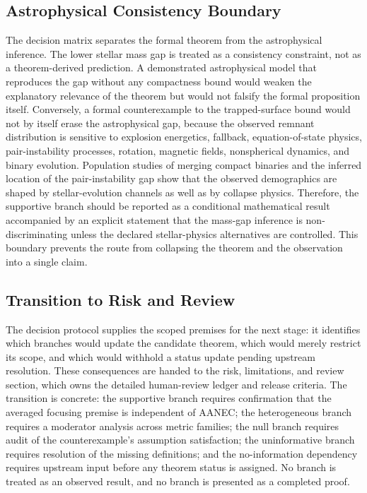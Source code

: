 \documentclass[conference]{IEEEtran}
\begin{document}
\subsection{Astrophysical Consistency Boundary}
The decision matrix separates the formal theorem from the astrophysical inference. The lower stellar mass gap is treated as a consistency constraint, not as a theorem-derived prediction. A demonstrated astrophysical model that reproduces the gap without any compactness bound would weaken the explanatory relevance of the theorem but would not falsify the formal proposition itself. Conversely, a formal counterexample to the trapped-surface bound would not by itself erase the astrophysical gap, because the observed remnant distribution is sensitive to explosion energetics, fallback, equation-of-state physics, pair-instability processes, rotation, magnetic fields, nonspherical dynamics, and binary evolution. Population studies of merging compact binaries and the inferred location of the pair-instability gap show that the observed demographics are shaped by stellar-evolution channels as well as by collapse physics. Therefore, the supportive branch should be reported as a conditional mathematical result accompanied by an explicit statement that the mass-gap inference is non-discriminating unless the declared stellar-physics alternatives are controlled. This boundary prevents the route from collapsing the theorem and the observation into a single claim.~\cite{cite_7a407c865faafd11,cite_cbbced417410bc6c,cite_f634820e22d7a238}

\subsection{Transition to Risk and Review}
The decision protocol supplies the scoped premises for the next stage: it identifies which branches would update the candidate theorem, which would merely restrict its scope, and which would withhold a status update pending upstream resolution. These consequences are handed to the risk, limitations, and review section, which owns the detailed human-review ledger and release criteria. The transition is concrete: the supportive branch requires confirmation that the averaged focusing premise is independent of AANEC; the heterogeneous branch requires a moderator analysis across metric families; the null branch requires audit of the counterexample's assumption satisfaction; the uninformative branch requires resolution of the missing definitions; and the no-information dependency requires upstream input before any theorem status is assigned. No branch is treated as an observed result, and no branch is presented as a completed proof.
\end{document}
